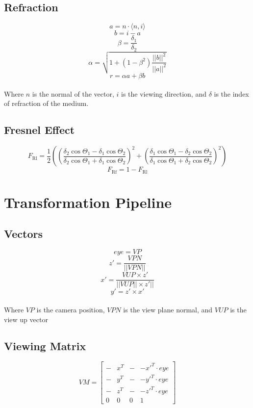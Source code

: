 \documentclass{article}
\begin{document}
\subsection{Refraction}
\vspace{.3cm}
\[ a = n \cdot \langle n, i \rangle \]
\[ b = i - a \]
\[ \beta = \frac{\delta_1}{\delta_2} \]
\[ \alpha = \sqrt{1 + ( 1 - \beta^2) \frac{||b||^2}{||a||^2}} \]
\[ r = \alpha a + \beta b \] \\
Where $n$ is the normal of the vector, $i$ is the viewing direction, and $\delta$ is the index of refraction of the medium.

\subsection{Fresnel Effect}
\vspace{.3cm}
\[ F_{\text{Rl}} = \frac{1}{2} \left( \left( \frac{\delta_2 \cos\Theta_1 - \delta_1 \cos \Theta_2}{\delta_2 \cos\Theta_1 + \delta_1 \cos \Theta_2} \right)^2 + \left( \frac{\delta_1 \cos\Theta_1 - \delta_2 \cos \Theta_2}{\delta_1 \cos\Theta_1 + \delta_2 \cos \Theta_2} \right)^2 \right) \]
\[ F_{\text{Rf}} = 1 - F_{\text{Rl}} \]

\section{Transformation Pipeline}
\subsection{Vectors}
\vspace{.3cm}
\[ eye = VP \]
\[ z' = \frac{VPN}{||VPN||} \]
\[ x' = \frac{VUP \times z'}{||VUP|| \times z'||} \]
\[ y' = z' \times x' \] \\
Where $VP$ is the camera position, $VPN$ is the view plane normal, and $VUP$ is the view up vector

\subsection{Viewing Matrix}
\vspace{.3cm}
\[ VM = \begin{bmatrix} - & x^T & - & -x'^T \cdot eye \\ - & y^T & - & -y'^T \cdot eye \\ - & z^T & - & -z'^T \cdot eye \\ 0 & 0 & 0 & 1 \end{bmatrix} \]
\end{document}
